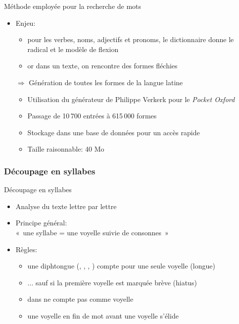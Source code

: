\documentclass{beamer}
\newcommand{\lettre}[1]{\emph{\structure{#1}}}
\begin{document}
\begin{frame}{Méthode employée pour la recherche de mots}

\begin{itemize}

\item Enjeu:

\begin{itemize}
\item pour les verbes, noms, adjectifs et pronoms, le dictionnaire donne le radical et le modèle de flexion
\item or dans un texte, on rencontre des formes fléchies
\end{itemize}

\vfill

\item[$\Rightarrow$] Génération de toutes les formes de la langue latine

\begin{itemize}
\item Utilisation du générateur de Philippe Verkerk pour le \emph{Pocket Oxford}
\item Passage de 10\,700 entrées à 615\,000 formes
\item Stockage dans une base de données pour un accès rapide
\item Taille raisonnable: 40 Mo
\end{itemize}

\end{itemize}

\end{frame} %


\subsubsection{Découpage en syllabes}

\begin{frame}{Découpage en syllabes}

\begin{itemize}
\item Analyse du texte lettre par lettre
\item Principe général:\\ «~une syllabe = une voyelle suivie de consonnes~»
\item Règles:

\begin{itemize}
\item une diphtongue (\lettre{ae}, \lettre{oe}, \lettre{eu}, \lettre{au}) compte pour une seule voyelle (longue)
\item ... sauf si la première voyelle est marquée brève (hiatus)
\item \lettre{u} dans \lettre{qu} ne compte pas comme voyelle
\item une voyelle en fin de mot avant une voyelle s'élide
\end{itemize}

\end{itemize}
\end{frame} %
\end{document}
